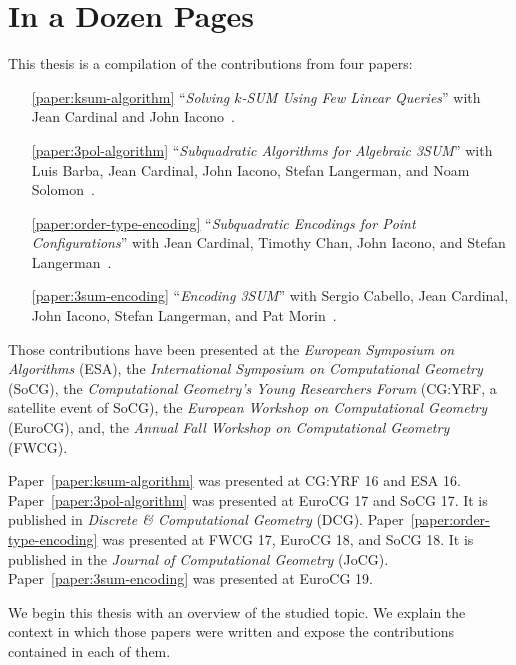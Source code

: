 \chapter{In a Dozen Pages}



This thesis is a compilation of the contributions from four papers:
%
\begin{enumerate}
	\item[\ref{paper:ksum-algorithm}] ``\emph{Solving \(k\)-SUM Using Few
		Linear Queries}''
		with Jean Cardinal and John Iacono~\cite{CIO16}.
	\item[\ref{paper:3pol-algorithm}] ``\emph{Subquadratic Algorithms for
		Algebraic 3SUM}''
		with Luis Barba, Jean Cardinal, John Iacono, Stefan Langerman, and Noam Solomon~\cite{BCILOS19}.
	\item[\ref{paper:order-type-encoding}] ``\emph{Subquadratic Encodings for
		Point Configurations}''
		with Jean Cardinal, Timothy Chan, John Iacono, and Stefan Langerman~\cite{CCILO19}.
	\item[\ref{paper:3sum-encoding}] ``\emph{Encoding 3SUM}''
		with Sergio Cabello, Jean Cardinal, John Iacono, Stefan Langerman,
		and Pat Morin~\cite{CCILMO19}.
\end{enumerate}
%
Those contributions have been presented at
the \emph{European Symposium on Algorithms} (ESA),
the \emph{International Symposium on Computational Geometry} (SoCG),
the \emph{Computational Geometry's Young Researchers Forum} (CG:YRF,
a satellite event of SoCG),
the \emph{European Workshop on Computational Geometry} (EuroCG),
and,
the \emph{Annual Fall Workshop on Computational Geometry} (FWCG).

Paper~\ref{paper:ksum-algorithm} was presented at CG:YRF 16 and ESA 16.
%
Paper~\ref{paper:3pol-algorithm} was presented at EuroCG 17 and SoCG 17.
It is published in \emph{Discrete \& Computational Geometry} (DCG).
%
Paper~\ref{paper:order-type-encoding} was presented at FWCG 17, EuroCG 18, and SoCG 18.
It is published in the \emph{Journal of Computational Geometry} (JoCG).
%
Paper~\ref{paper:3sum-encoding} was presented at EuroCG 19.

We begin this thesis with an overview of the studied topic.
%
We explain the context in which those papers were written and expose
the contributions contained in each of them.

